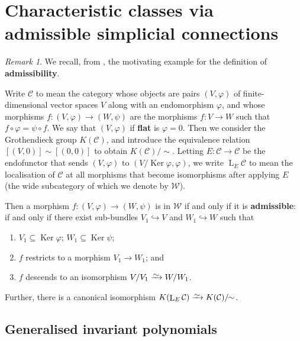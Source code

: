 \documentclass[11pt,fleqn]{article}
\theoremstyle{plain}
\theoremstyle{definition}
\theoremstyle{remark}
\newtheorem{remark}[theorem]{Remark}
\numberwithin{equation}{theorem}
\newcommand{\congto}{\xrightarrow{\raisebox{-.5ex}[0ex][0ex]{$\sim$}}}
\newcommand{\define}[1]{\textbf{#1}}
\DeclareMathOperator{\Ker}{Ker}
\DeclareMathOperator{\LL}{L}
\begin{document}
\section{Characteristic classes via admissible simplicial connections}\label{section:characteristic-classes-via-admissible-simplicial-connections}

    \begin{remark}\label{remark:the-motivating-example-recalled}
        We recall, from \cite[§3.2]{Hosgood2020a}, the motivating example for the definition of \define{admissibility}.

        Write $\mathcal{C}$ to mean the category whose objects are pairs $(V,\varphi)$ of finite-dimensional vector spaces $V$ along with an endomorphism $\varphi$, and whose morphisms $f\colon(V,\varphi)\to(W,\psi)$ are the morphisms $f\colon V\to W$ such that $f\circ\varphi=\psi\circ f$.
        We say that $(V,\varphi)$ if \define{flat} is $\varphi=0$.
        Then we consider the Grothendieck group $K(\mathcal{C})$, and introduce the equivalence relation $[(V,0)]\sim[(0,0)]$ to obtain $K(\mathcal{C})/\!\!\sim$.
        Letting $E\colon\mathcal{C}\to\mathcal{C}$ be the endofunctor that sends $(V,\varphi)$ to $(V/\Ker\varphi,\varphi)$, we write $\LL_E\mathcal{C}$ to mean the localisation of $\mathcal{C}$ at all morphisms that become isomorphisms after applying $E$ (the wide subcategory of which we denote by $\mathcal{W}$).

        Then a morphism $f\colon(V,\varphi)\to(W,\psi)$ is in $\mathcal{W}$ if and only if it is \define{admissible}: if and only if there exist sub-bundles $V_1\hookrightarrow V$ and $W_1\hookrightarrow W$ such that
            \begin{enumerate}
                \item $V_1\subseteq\Ker\varphi$; $W_1\subseteq\Ker\psi$;
                \item $f$ restricts to a morphism $V_1\to W_1$; and
                \item $f$ descends to an isomorphism $V/V_1\congto W/W_1$.
            \end{enumerate}
        Further, there is a canonical isomorphism $K(\LL_E\mathcal{C})\congto K(\mathcal{C})/\!\!\sim$.
    \end{remark}


    \subsection{Generalised invariant polynomials}
\end{document}
